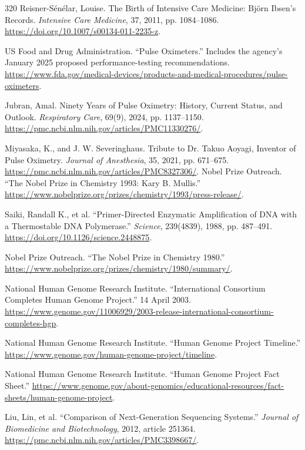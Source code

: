 \documentclass[12pt,oneside]{book}
\begin{document}
\begin{thebibliography}{320}
Reisner-Sénélar, Louise. The Birth of Intensive Care Medicine: Björn Ibsen's
Records. \emph{Intensive Care Medicine}, 37, 2011, pp. 1084--1086.
\url{https://doi.org/10.1007/s00134-011-2235-z}.

US Food and Drug Administration. ``Pulse Oximeters.'' Includes the agency's
January 2025 proposed performance-testing recommendations.
\url{https://www.fda.gov/medical-devices/products-and-medical-procedures/pulse-oximeters}.

Jubran, Amal. Ninety Years of Pulse Oximetry: History, Current Status, and
Outlook. \emph{Respiratory Care}, 69(9), 2024, pp. 1137--1150.
\url{https://pmc.ncbi.nlm.nih.gov/articles/PMC11330276/}.

Miyasaka, K., and J. W. Severinghaus. Tribute to Dr. Takuo Aoyagi, Inventor of
Pulse Oximetry. \emph{Journal of Anesthesia}, 35, 2021, pp. 671--675.
\url{https://pmc.ncbi.nlm.nih.gov/articles/PMC8327306/}.
Nobel Prize Outreach. ``The Nobel Prize in Chemistry 1993: Kary B. Mullis.''
\url{https://www.nobelprize.org/prizes/chemistry/1993/press-release/}.

Saiki, Randall K., et al. ``Primer-Directed Enzymatic Amplification of DNA
with a Thermostable DNA Polymerase.'' \emph{Science}, 239(4839), 1988,
pp. 487--491. \url{https://doi.org/10.1126/science.2448875}.

Nobel Prize Outreach. ``The Nobel Prize in Chemistry 1980.''
\url{https://www.nobelprize.org/prizes/chemistry/1980/summary/}.

National Human Genome Research Institute. ``International Consortium
Completes Human Genome Project.'' 14 April 2003.
\url{https://www.genome.gov/11006929/2003-release-international-consortium-completes-hgp}.

National Human Genome Research Institute. ``Human Genome Project Timeline.''
\url{https://www.genome.gov/human-genome-project/timeline}.

National Human Genome Research Institute. ``Human Genome Project Fact Sheet.''
\url{https://www.genome.gov/about-genomics/educational-resources/fact-sheets/human-genome-project}.

Liu, Lin, et al. ``Comparison of Next-Generation Sequencing Systems.''
\emph{Journal of Biomedicine and Biotechnology}, 2012, article 251364.
\url{https://pmc.ncbi.nlm.nih.gov/articles/PMC3398667/}.


\end{thebibliography}
\end{document}
